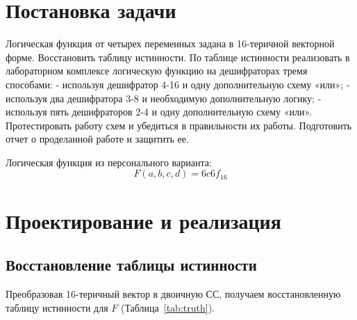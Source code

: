 \documentclass[a4paper]{article}
\author{Буренин А.А}
\begin{document}
	
	
	\tableofcontents{}
	
	\clearpage
	
	
	\section{Постановка задачи}\label{sec:introduction}
	Логическая функция от четырех переменных задана в 16-теричной векторной форме. Восстановить таблицу истинности. По таблице истинности 
	реализовать в лабораторном комплексе логическую функцию на дешифраторах тремя способами:
	- используя дешифратор 4-16 и одну дополнительную схему «или»;
	- используя два дешифратора 3-8 и необходимую дополнительную логику;
	- используя пять дешифраторов 2-4 и одну дополнительную схему «или».
	Протестировать работу схем и убедиться в правильности их работы. 
	Подготовить отчет о проделанной работе и защитить ее.
	
	Логическая функция из персонального варианта:
	\[ F(a, b, c, d) = 6c6f_{16} \]
	
	
	\section{Проектирование и реализация}\label{sec:implementation}
	
	\subsection{Восстановление таблицы истинности}\label{subsec:table-recovering}
	Преобразовав 16-теричный вектор в двоичную СС, получаем восстановленную таблицу
	истинности для $ F $ (Таблица~\ref{tab:truth}).
	
\end{document}
